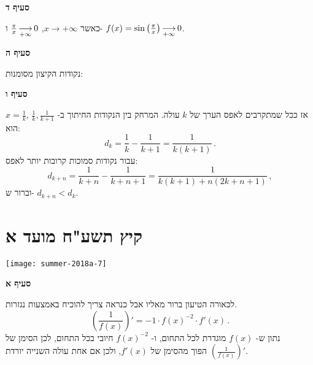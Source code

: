 \textbf{סעיף ד}

כאשר 
$x\rightarrow +\infty$,
$\frac{\pi}{x} \mathop{\longrightarrow}\limits_{+\infty} 0$
ו-%
$f(x)=\sin\left(\frac{\pi}{x}\right)\mathop{\longrightarrow}\limits_{+\infty} 0$.

\textbf{סעיף ה}

נקודות הקיצון מסומנות:
\begin{center}
\end{center}

\vspace{-2ex}

\textbf{סעיף ו}

$x=\frac{1}{k}$,
אז ככל שמתקרבים לאפס הערך של 
$k$
עולה. המרחק בין הנקודות החיתוך ב-%
$\frac{1}{k},\frac{1}{k+1}$
הוא:
\[
d_k=\frac{1}{k}-\frac{1}{k+1}=\frac{1}{k(k+1)}\,.
\]
עבור נקודות סמוכות קרובות יותר לאפס:
\[
d_{k+n}=\frac{1}{k+n}-\frac{1}{k+n+1}=\frac{1}{k(k+1)+n(2k+n+1)}\,,
\]
וברור ש-%
$d_{k+n}<d_k$.

\np



\section{קיץ תשע"ח מועד א}

\begin{center}
\texttt{[image: summer-2018a-7]}
\end{center}

\vspace{-2ex}

\textbf{סעיף א}

לכאורה הטיעון ברור מאליו אבל כנראה צריך להוכיח באמצעות נגזרות.
\[
\left(\frac{1}{f(x)}\right)'=-1\cdot f(x)^{-2} \cdot f'(x)\,.
\]
נתון ש-%
$f(x)$
מוגדרת לכל התחום, ו-%
$f(x)^{-2}$
חיובי בכל התחום, לכן הסימן של
$\left(\frac{1}{f(x)}\right)'$
הפוך מהסימן של
$f'(x)$,
ולכן אם אחת עולה השנייה יורדת.

